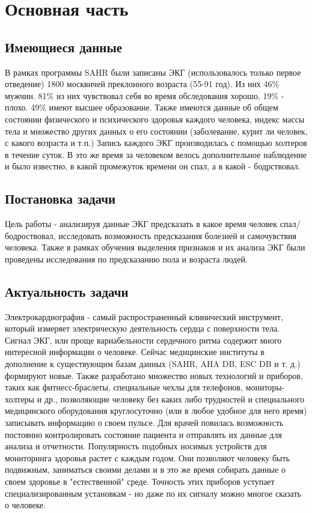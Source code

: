 \chapter{Основная часть}
\section{Имеющиеся данные}
В рамках программы SAHR были записаны ЭКГ (использовалось только первое отведение) 1800 москвичей преклонного возраста (55-91 год). Из них 46\% мужчин. 81\% из них чувствовал себя во время обследования хорошо, 19\% - плохо. 49\% имеют высшее образование. Также имеются данные об общем состоянии физического и психического здоровья каждого человека, индекс массы тела и множество других данных о его состоянии (заболевание, курит ли человек, с какого возраста и т.п.) Запись каждого ЭКГ производилась с помощью холтеров в течение суток. В это же время за человеком велось дополнительное наблюдение и было известно, в какой промежуток времени он спал, а в какой - бодрствовал.
\section{Постановка задачи}

Цель работы - анализируя данные ЭКГ предсказать в какое время человек спал/бодроствовал, исследовать возможность предсказания болезней и самочувствия человека. Также в рамках обучения выделения признаков и их анализа ЭКГ были проведены исследования по предсказанию пола и возраста людей.

\section{Актуальность задачи}
Электрокардиография - самый распространенный клинический инструмент, который измеряет электрическую деятельность сердца с поверхности тела. Сигнал ЭКГ, или проще вариабельности сердечного ритма содержит много интересной информации о человеке. Сейчас медицинские институты в дополнение к существующим базам данных (SAHR, AHA DB, ESC DB и т. д.) формируют новые. Также разработано множество новых технологий и приборов, таких как фитнесс-браслеты, специальные чехлы для телефонов, мониторы-холтеры и др., позволяющие человеку без каких либо трудностей и специального медицинского оборудования круглосуточно (или в любое удобное для него время) записывать информацию о своем пульсе. Для врачей повилась возможность постоянно контролировать состояние пациента и отправлять их данные  для анализа и отчетности. Популярность подобных носимых устройств для мониторинга здоровья растет с каждым годом. Они позволяют человеку быть подвижным, заниматься своими делами и в это же время собирать данные о своем здоровье в "естественной" среде. Точность этих приборов уступает специализированным установкам - но даже по их сигналу можно многое сказать о человеке. 

